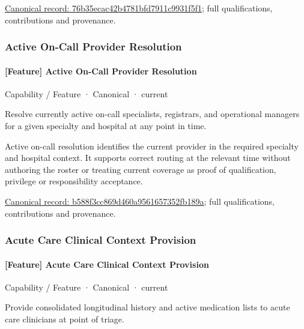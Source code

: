 {\footnotesize \href{../../../../continuum/strategy/capability/feature/76b35ecac42b4781bfd7911c9931f5f1.md}{Canonical record: 76b35ecac42b4781bfd7911c9931f5f1}; full qualifications, contributions and provenance.}\par
\subsubsection{Active On-Call Provider Resolution}

\paragraph{[Feature] Active On-Call Provider Resolution}

\label{element:b588f3cc869d460a9561657352fb189a}
{\small Capability / Feature · Canonical · current}\par

Resolve currently active on-call specialists, registrars, and operational managers for a given specialty and hospital at any point in time.



Active on-call resolution identifies the current provider in the required specialty and hospital context. It supports correct routing at the relevant time without authoring the roster or treating current coverage as proof of qualification, privilege or responsibility acceptance.


{\footnotesize \href{../../../../continuum/strategy/capability/feature/b588f3cc869d460a9561657352fb189a.md}{Canonical record: b588f3cc869d460a9561657352fb189a}; full qualifications, contributions and provenance.}\par
\subsubsection{Acute Care Clinical Context Provision}

\paragraph{[Feature] Acute Care Clinical Context Provision}

\label{element:90de621f7ac1410eb6fc770cb07a9e03}
{\small Capability / Feature · Canonical · current}\par

Provide consolidated longitudinal history and active medication lists to acute care clinicians at point of triage.



